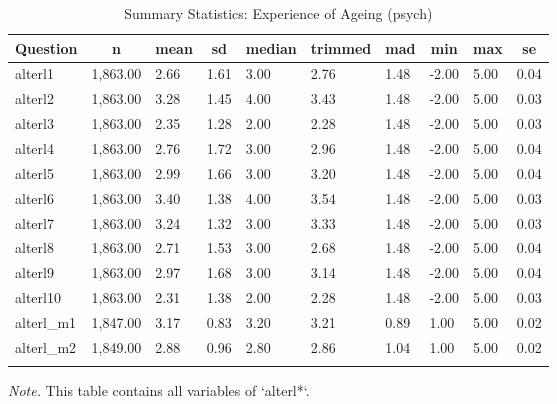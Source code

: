 \documentclass[
  doc]{apa6}
\begin{document}
\begin{table}[tbp]

\begin{center}
\begin{threeparttable}

\caption{\label{tab:tabsumstatalterpsych}Summary Statistics: Experience of Ageing (psych)}

\begin{tabular}{llllllllll}
\toprule
Question & \multicolumn{1}{c}{n} & \multicolumn{1}{c}{mean} & \multicolumn{1}{c}{sd} & \multicolumn{1}{c}{median} & \multicolumn{1}{c}{trimmed} & \multicolumn{1}{c}{mad} & \multicolumn{1}{c}{min} & \multicolumn{1}{c}{max} & \multicolumn{1}{c}{se}\\
\midrule
alterl1 & 1,863.00 & 2.66 & 1.61 & 3.00 & 2.76 & 1.48 & -2.00 & 5.00 & 0.04\\
alterl2 & 1,863.00 & 3.28 & 1.45 & 4.00 & 3.43 & 1.48 & -2.00 & 5.00 & 0.03\\
alterl3 & 1,863.00 & 2.35 & 1.28 & 2.00 & 2.28 & 1.48 & -2.00 & 5.00 & 0.03\\
alterl4 & 1,863.00 & 2.76 & 1.72 & 3.00 & 2.96 & 1.48 & -2.00 & 5.00 & 0.04\\
alterl5 & 1,863.00 & 2.99 & 1.66 & 3.00 & 3.20 & 1.48 & -2.00 & 5.00 & 0.04\\
alterl6 & 1,863.00 & 3.40 & 1.38 & 4.00 & 3.54 & 1.48 & -2.00 & 5.00 & 0.03\\
alterl7 & 1,863.00 & 3.24 & 1.32 & 3.00 & 3.33 & 1.48 & -2.00 & 5.00 & 0.03\\
alterl8 & 1,863.00 & 2.71 & 1.53 & 3.00 & 2.68 & 1.48 & -2.00 & 5.00 & 0.04\\
alterl9 & 1,863.00 & 2.97 & 1.68 & 3.00 & 3.14 & 1.48 & -2.00 & 5.00 & 0.04\\
alterl10 & 1,863.00 & 2.31 & 1.38 & 2.00 & 2.28 & 1.48 & -2.00 & 5.00 & 0.03\\
alterl\_m1 & 1,847.00 & 3.17 & 0.83 & 3.20 & 3.21 & 0.89 & 1.00 & 5.00 & 0.02\\
alterl\_m2 & 1,849.00 & 2.88 & 0.96 & 2.80 & 2.86 & 1.04 & 1.00 & 5.00 & 0.02\\
\bottomrule
\addlinespace
\end{tabular}

\begin{tablenotes}[para]
\normalsize{\textit{Note.} This table contains all variables of `alterl*`.}
\end{tablenotes}

\end{threeparttable}
\end{center}

\end{table}
\end{document}
